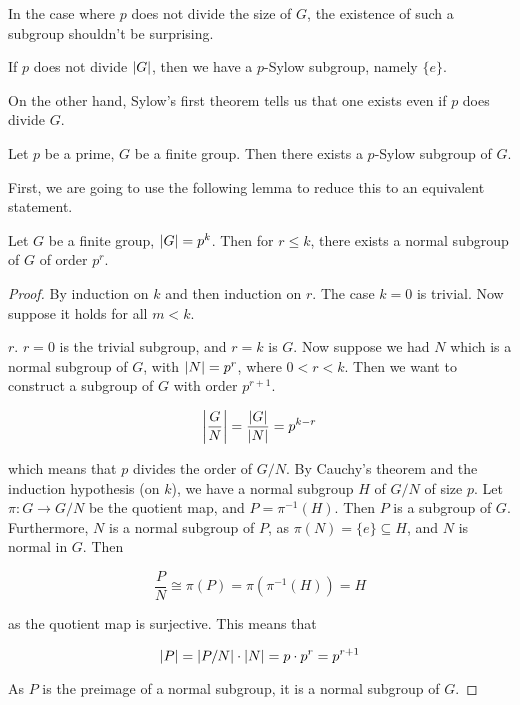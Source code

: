 \documentclass{article}
\begin{document}
    In the case where $p$ does not divide the size of $G$, the existence of such a subgroup shouldn't be surprising.

    \begin{example*}
        If $p$ does not divide $\abs{G}$, then we have a $p$-Sylow subgroup, namely $\{e\}$.
    \end{example*}

    On the other hand, Sylow's first theorem tells us that one exists even if $p$ does divide $G$.

    \begin{theorem*}
        [Sylow I] Let $p$ be a prime, $G$ be a finite group. Then there exists a $p$-Sylow subgroup of $G$.
    \end{theorem*}

    First, we are going to use the following lemma to reduce this to an equivalent statement.

    \begin{lemma*}
        Let $G$ be a finite group, $\abs{G} = p^k$. Then for $r \le k$, there exists a normal subgroup of $G$ of order $p^r$. 
    \end{lemma*}

    \begin{proof}
        By induction on $k$ and then induction on $r$. The case $k = 0$ is trivial. Now suppose it holds for all $m < k$.
        
        $r$. $r = 0$ is the trivial subgroup, and $r = k$ is $G$. Now suppose we had $N$ which is a normal subgroup of $G$, with $\abs{N} = p^r$, where $0 < r < k$. Then we want to construct a subgroup of $G$ with order $p^{r+1}$.
        
        $$\abs{\frac{G}{N}}=\frac{\abs{G}}{\abs{N}} = p^{k - r}$$

        which means that $p$ divides the order of $G/N$. By Cauchy's theorem and the induction hypothesis (on $k$), we have a normal subgroup $H$ of $G/N$ of size $p$. Let $\pi : G \to G/N$ be the quotient map, and $P = \pi^{-1}(H)$. Then $P$ is a subgroup of $G$. Furthermore, $N$ is a normal subgroup of $P$, as $\pi(N) = \{e\} \subseteq H$, and $N$ is normal in $G$. Then
        
        $$\frac{P}{N} \cong \pi(P) = \pi\left(\pi^{-1}(H)\right) = H$$

        as the quotient map is surjective. This means that

        $$\abs{P} = \abs{P / N} \cdot \abs{N} = p \cdot p^r = p^{r + 1}$$

        As $P$ is the preimage of a normal subgroup, it is a normal subgroup of $G$.
    \end{proof}
\end{document}

